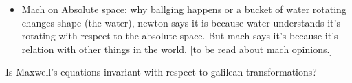 \documentclass[10pt,a4paper,twocolumn]{article}
\newenvironment{callout}
	{\begin{calloutbox}\color{charcoal}\textbf\textit}
	{\end{calloutbox}}
\begin{document}
\begin{itemize}
\begin{callout}
                    Weak Equivalence Principle
               \end{callout}
               \begin{align*}
                    F &=m_I a =-kx\\
                    &= m_I \frac{d^2x}{dt^2} +kx =0\\
                    &=\frac{d^2x}{dt^2} +\frac{k}{m_I}x =0\\
                    &=\frac{d^2x}{dt^2}+\omega^2 x = 0\\
                    F &= -m_g g\sin\theta\\
                    &=m_g g(\theta \ell)/\ell\\
                    &=(-m_g g/\ell)x \Rightarrow k=m_gg/\ell
               \end{align*}

               \item Mach on Absolute space: why ballging happens or a bucket of water rotating changes shape (the water), newton says it is because water understands it's rotating with respect to the absolute space. But mach says it's because it's relation with other things in the world. [to be read about mach opinions.]
               \end{itemize}
               \begin{exc}
                    Is Maxwell's equations invariant with respect to galilean transformations?
               \end{exc}
\end{document}
